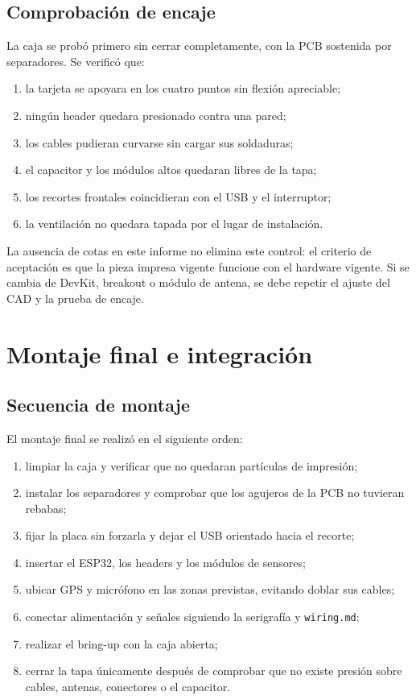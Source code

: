 \documentclass[11pt,a4paper,oneside]{report}
\newcommand{\codigo}[1]{\texttt{\small #1}}
\begin{document}
\section{Comprobación de encaje}

La caja se probó primero sin cerrar completamente, con la PCB sostenida por
separadores. Se verificó que:

\begin{enumerate}
  \item la tarjeta se apoyara en los cuatro puntos sin flexión apreciable;
  \item ningún header quedara presionado contra una pared;
  \item los cables pudieran curvarse sin cargar sus soldaduras;
  \item el capacitor y los módulos altos quedaran libres de la tapa;
  \item los recortes frontales coincidieran con el USB y el interruptor;
  \item la ventilación no quedara tapada por el lugar de instalación.
\end{enumerate}

La ausencia de cotas en este informe no elimina este control: el criterio de
aceptación es que la pieza impresa vigente funcione con el hardware vigente. Si se
cambia de DevKit, breakout o módulo de antena, se debe repetir el ajuste del CAD y
la prueba de encaje.

\chapter{Montaje final e integración}

\section{Secuencia de montaje}

El montaje final se realizó en el siguiente orden:

\begin{enumerate}
  \item limpiar la caja y verificar que no quedaran partículas de impresión;
  \item instalar los separadores y comprobar que los agujeros de la PCB no tuvieran
        rebabas;
  \item fijar la placa sin forzarla y dejar el USB orientado hacia el recorte;
  \item insertar el ESP32, los headers y los módulos de sensores;
  \item ubicar GPS y micrófono en las zonas previstas, evitando doblar sus cables;
  \item conectar alimentación y señales siguiendo la serigrafía y \codigo{wiring.md};
  \item realizar el bring-up con la caja abierta;
  \item cerrar la tapa únicamente después de comprobar que no existe presión sobre
        cables, antenas, conectores o el capacitor.
\end{enumerate}
\end{document}
